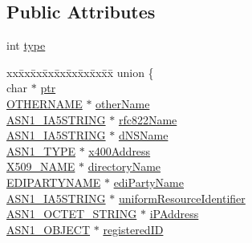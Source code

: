 \subsection*{Public Attributes}
\begin{DoxyCompactItemize}
\item 
int \hyperlink{struct_g_e_n_e_r_a_l___n_a_m_e__st_adee285a4ad25557f12d51af03e1cf0e2}{type}
\item 
\begin{tabbing}
xx\=xx\=xx\=xx\=xx\=xx\=xx\=xx\=xx\=\kill
union \{\\
\>char $\ast$ \hyperlink{struct_g_e_n_e_r_a_l___n_a_m_e__st_a5039ded4e07e479ab3a454c4f8a88b91}{ptr}\\
\>\hyperlink{x509v3_8h_a1ef6e832b0cb6e3b0b520f50bab5aaf3}{OTHERNAME} $\ast$ \hyperlink{struct_g_e_n_e_r_a_l___n_a_m_e__st_ad84a8e1e2fa21720be0371e4ce5c5937}{otherName}\\
\>\hyperlink{ossl__typ_8h_a0d915c339a64c1c9871d5404e51c44fd}{ASN1\_IA5STRING} $\ast$ \hyperlink{struct_g_e_n_e_r_a_l___n_a_m_e__st_aae4d5f6fd8689ac123252ef23c718581}{rfc822Name}\\
\>\hyperlink{ossl__typ_8h_a0d915c339a64c1c9871d5404e51c44fd}{ASN1\_IA5STRING} $\ast$ \hyperlink{struct_g_e_n_e_r_a_l___n_a_m_e__st_a29abc268b7c357a72de9ab426bf50a2b}{dNSName}\\
\>\hyperlink{asn1_8h_a7895e03d9fee2bc4963faf2a31a9439e}{ASN1\_TYPE} $\ast$ \hyperlink{struct_g_e_n_e_r_a_l___n_a_m_e__st_a7604972ca3d4a6c91fb715e0e2c35239}{x400Address}\\
\>\hyperlink{ossl__typ_8h_a5c5fc036757e87b9bd163d0221696533}{X509\_NAME} $\ast$ \hyperlink{struct_g_e_n_e_r_a_l___n_a_m_e__st_a13544e051c7e8f80aeb1b7efd382bdff}{directoryName}\\
\>\hyperlink{x509v3_8h_acd94697b062004e7e888823f79239c2a}{EDIPARTYNAME} $\ast$ \hyperlink{struct_g_e_n_e_r_a_l___n_a_m_e__st_a9b4bf4956be3303623454b56401a16d7}{ediPartyName}\\
\>\hyperlink{ossl__typ_8h_a0d915c339a64c1c9871d5404e51c44fd}{ASN1\_IA5STRING} $\ast$ \hyperlink{struct_g_e_n_e_r_a_l___n_a_m_e__st_ade56ddf2991bf7b003bae3af6c0d8abc}{uniformResourceIdentifier}\\
\>\hyperlink{ossl__typ_8h_afbd05e94e0f0430a2b729473efec88c1}{ASN1\_OCTET\_STRING} $\ast$ \hyperlink{struct_g_e_n_e_r_a_l___n_a_m_e__st_aa937047364647fca8819ef6322be1aa3}{iPAddress}\\
\>\hyperlink{asn1_8h_ae10c08e4e6b23f67a39b2add932ec48f}{ASN1\_OBJECT} $\ast$ \hyperlink{struct_g_e_n_e_r_a_l___n_a_m_e__st_a27b461215548081251e5d11b2ba88a50}{registeredID}\\

\end{tabbing}
\end{DoxyCompactItemize}
